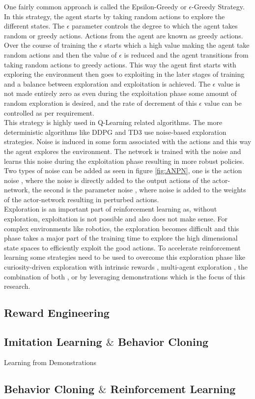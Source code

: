 One fairly common approach is called the Epsilon-Greedy or $\epsilon$-Greedy Strategy. In this strategy, the agent starts by taking random actions to explore the different states. The $\epsilon$ parameter controls the degree to which the agent takes random or greedy actions. Actions from the agent are known as greedy actions. Over the course of training the $\epsilon$ starts which a high value making the agent take random actions and then the value of $\epsilon$ is reduced and the agent transitions from taking random actions to greedy actions. This way the agent first starts with exploring the environment then goes to exploiting in the later stages of training and a balance between exploration and exploitation is achieved. The $\epsilon$ value is not made entirely zero as even during the exploitation phase some amount of random exploration is desired, and the rate of decrement of this $\epsilon$ value can be controlled as per requirement. \\

This strategy is highly used in Q-Learning related algorithms. The more deterministic algorithms like DDPG and TD3 use noise-based exploration strategies. Noise is induced in some form associated with the actions and this way the agent explores the environment. The network is trained with the noise and learns this noise during the exploitation phase resulting in more robust policies. Two types of noise can be added as seen in figure \ref{fig:ANPN}, one is the action noise \cite{lillicrap2019continuous} \cite{fujimoto2018addressing}, where the noise is directly added to the output actions of the actor-network, the second is the parameter noise \cite{plappert2018parameter}, where noise is added to the weights of the actor-network resulting in perturbed actions. \\

Exploration is an important part of reinforcement learning as, without exploration, exploitation is not possible and also does not make sense. For complex environments like robotics, the exploration becomes difficult and this phase takes a major part of the training time to explore the high dimensional state spaces to efficiently exploit the good actions. To accelerate reinforcement learning some strategies need to be used to overcome this exploration phase like curiosity-driven exploration with intrinsic rewards \cite{burda2018exploration}, multi-agent exploration \cite{lowe2020multiagent}, the combination of both \cite{lanier2019curiositydriven}, or by leveraging demonstrations which is the focus of this research. \\

\subsection{Reward Engineering}

\subsection{Imitation Learning $\&$ Behavior Cloning}
Learning from Demonstrations

\subsection{Behavior Cloning $\&$ Reinforcement Learning}

